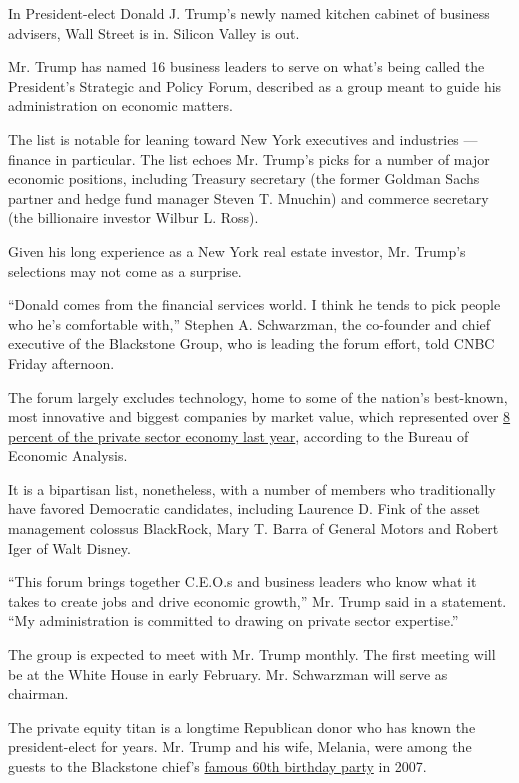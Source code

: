 In President-elect Donald J. Trump's newly named kitchen cabinet of
business advisers, Wall Street is in. Silicon Valley is out.

Mr. Trump has named 16 business leaders to serve on what's being called
the President's Strategic and Policy Forum, described as a group meant
to guide his administration on economic matters.

The list is notable for leaning toward New York executives and
industries --- finance in particular. The list echoes Mr. Trump's picks
for a number of major economic positions, including Treasury secretary
(the former Goldman Sachs partner and hedge fund manager Steven T.
Mnuchin) and commerce secretary (the billionaire investor Wilbur L.
Ross).

Given his long experience as a New York real estate investor, Mr.
Trump's selections may not come as a surprise.

``Donald comes from the financial services world. I think he tends to
pick people who he's comfortable with,'' Stephen A. Schwarzman, the
co-founder and chief executive of the Blackstone Group, who is leading
the forum effort, told CNBC Friday afternoon.

The forum largely excludes technology, home to some of the nation's
best-known, most innovative and biggest companies by market value, which
represented over
\href{http://www.bea.gov/newsreleases/industry/gdpindustry/2016/pdf/gdpind216.pdf}{8
percent of the private sector economy last year}, according to the
Bureau of Economic Analysis.

It is a bipartisan list, nonetheless, with a number of members who
traditionally have favored Democratic candidates, including Laurence D.
Fink of the asset management colossus BlackRock, Mary T. Barra of
General Motors and Robert Iger of Walt Disney.

``This forum brings together C.E.O.s and business leaders who know what
it takes to create jobs and drive economic growth,'' Mr. Trump said in a
statement. ``My administration is committed to drawing on private sector
expertise.''

The group is expected to meet with Mr. Trump monthly. The first meeting
will be at the White House in early February. Mr. Schwarzman will serve
as chairman.

The private equity titan is a longtime Republican donor who has known
the president-elect for years. Mr. Trump and his wife, Melania, were
among the guests to the Blackstone chief's
\href{http://dealbook.nytimes.com/2007/02/14/inside-stephen-schwarzmans-birthday-bash}{famous
60th birthday party} in 2007.


